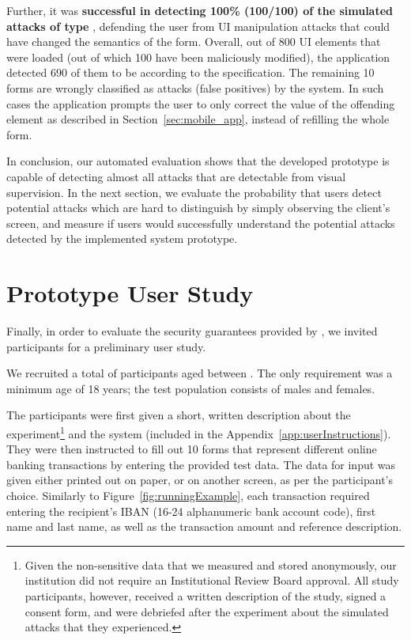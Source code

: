 Further, it was \textbf{successful in detecting 100\% (100/100) of the simulated attacks of type }, defending the user from UI manipulation attacks that could have changed the semantics of the form.
Overall, out of 800 UI elements that were loaded (out of which 100 have been maliciously modified), the application detected 690 of them to be according to the specification. The remaining 10 forms are wrongly classified as attacks (false positives) by the system. In such cases the application prompts the user to only correct the value of the offending element as described in Section~\ref{sec:mobile_app}, instead of refilling the whole form.


In conclusion, our automated evaluation shows that the developed prototype is capable of detecting almost all attacks that are detectable from visual supervision.
In the next section, we evaluate the probability that users detect potential attacks which are hard to distinguish by simply observing the client's screen, and measure if users would successfully understand the potential attacks detected by the implemented system prototype.


\section{Prototype User Study} \label{sec:userStudy}
Finally, in order to evaluate the security guarantees provided by \sysname, we invited participants for a preliminary user study.

We recruited a total of  participants aged between .
The only requirement was a minimum age of 18 years; the test population consists of  males and  females.

The participants were first given a short, written description about the experiment\footnote{Given the non-sensitive data that we measured and stored anonymously, our institution did not require an Institutional Review Board approval.
	All study participants, however, received a written description of the study, signed a consent form, and were debriefed after the experiment about the simulated attacks that they experienced.} and the \sysname system (included in the Appendix~\ref{app:userInstructions}).
They were then instructed to fill out 10 forms that represent different online banking transactions by entering the provided test data.
The data for input was given either printed out on paper, or on another screen, as per the participant's choice.
Similarly to Figure~\ref{fig:runningExample}, each transaction required entering the recipient's IBAN (16-24 alphanumeric bank account code), first name and last name, as well as the transaction amount and reference description.





